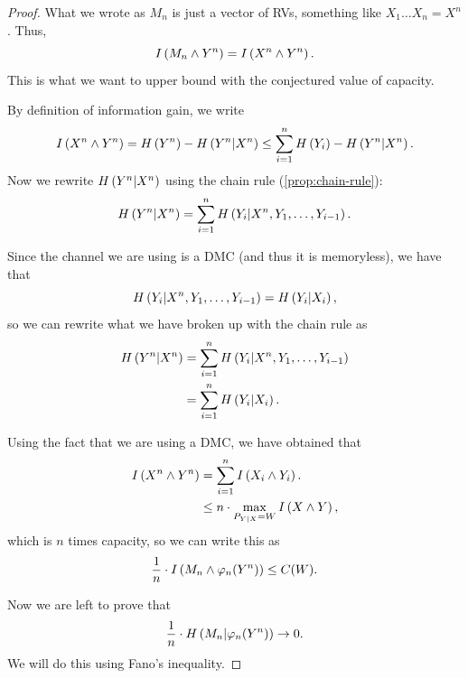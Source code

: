 \begin{proof}
	What we wrote as $M_n$ is just a vector of \acp{RV}, \ie something like $X_1 \dots X_n = X^n$.
	Thus,
	\begin{equation*}
		I \left( {M_n \land Y^n} \right) =
		I \left( {X^n \land Y^n} \right).
	\end{equation*}
	This is what we want to upper bound with the conjectured value of capacity.

	By definition of information gain, we write
	\begin{equation*}
		I \left( {X^n \land Y^n} \right) =
		H\left({Y^n}\right) - H\left({Y^n | X^n}\right) \le
		\sum_{i = 1}^n H\left({Y_i}\right) - H\left({Y^n | X^n}\right).
	\end{equation*}
	Now we rewrite $H\left({Y^n | X^n}\right)$ using the chain rule (\cref{prop:chain-rule}):
	\begin{equation*}
		H\left({Y^n | X^n}\right) =
		\sum_{i = 1}^n H\left({Y_i | X^n, Y_1, \dots, Y_{i-1}}\right).
	\end{equation*}

	Since the channel we are using is a \ac{DMC} (and thus it is memoryless), we have that
	\begin{equation*}
		H\left({Y_i | X^n, Y_1, \dots, Y_{i-1}}\right) =
		H\left({Y_i | X_i}\right),
	\end{equation*}
	so we can rewrite what we have broken up with the chain rule as
	\begin{align*}
		H\left({Y^n | X^n}\right)
		& =
		\sum_{i = 1}^n H\left({Y_i | X^n, Y_1, \dots, Y_{i-1}}\right)
		\\
		& =
		\sum_{i = 1}^{n} H\left({Y_i | X_i}\right).
	\end{align*}

	Using the fact that we are using a \ac{DMC}, we have obtained that
	\begin{align*}
		I \left( {X^n \land Y^n} \right)
		& =
		\sum_{i = 1}^{n} I \left( {X_i \land Y_i} \right).
		\\
		& \le
		n \cdot \max_{P_{Y|X} = W} I \left( {X \land Y} \right),
	\end{align*}
	which is $n$ times capacity, so we can write this as
	\begin{equation*}
		\frac{1}{n} \cdot I \left( {M_n \land \varphi_n(Y^n)} \right) \le C(W).
	\end{equation*}

	Now we are left to prove that
	\begin{equation*}
		\frac{1}{n} \cdot H\left({M_n | \varphi_n(Y^n)}\right) \to 0.
	\end{equation*}
	We will do this using Fano's inequality.


\end{proof}
